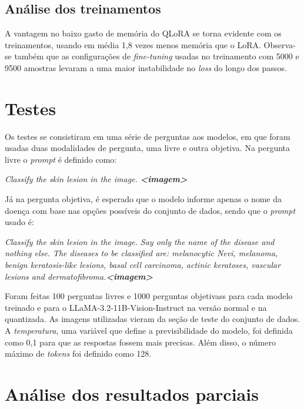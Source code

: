\subsection{Análise dos treinamentos}

A vantagem no baixo gasto de memória do \ac{QLoRA} se torna evidente com os treinamentos, usando em média 1,8 vezes menos memória que o \ac{LoRA}. Observa-se também
que as configurações de \textit{fine-tuning} usadas no treinamento com 5000 e 9500 amostras levaram a uma maior instabilidade no \textit{loss} do longo dos passos.

\section{Testes}

Os testes se consistiram em uma série de perguntas aos modelos, em que foram usadas duas modalidades de pergunta, uma livre e outra objetiva. Na pergunta livre o
\textit{prompt} é definido como:

\begin{dialogue}
     \textit{Classify the skin lesion in the image. \textbf{<imagem>}}
\end{dialogue}

Já na pergunta objetiva, é esperado que o modelo informe apenas o nome da doença com base nas opções possíveis do conjunto de dados, sendo que o \textit{prompt} usado é:

\begin{dialogue}
     \textit{Classify the skin lesion in the image. Say only the name of the disease and nothing else. The diseases to be classified are: melanocytic Nevi,
        melanoma, benign keratosis-like lesions, basal cell carcinoma, actinic keratoses, vascular lesions and dermatofibroma.\textbf{<imagem>}}
\end{dialogue}

Foram feitas 100 perguntas livres e 1000 perguntas objetivass para cada modelo treinado e para o \ac{LLaMA}-3.2-11B-Vision-Instruct na versão normal e na quantizada. As
imagens utilizadas vieram da seção de teste do conjunto de dados. A \textit{temperatura}, uma variável que define a previsibilidade do modelo, foi definida como 0,1
para que as respostas fossem mais precisas. Além disso, o número máximo de \textit{tokens} foi definido como 128.

\section{Análise dos resultados parciais}

